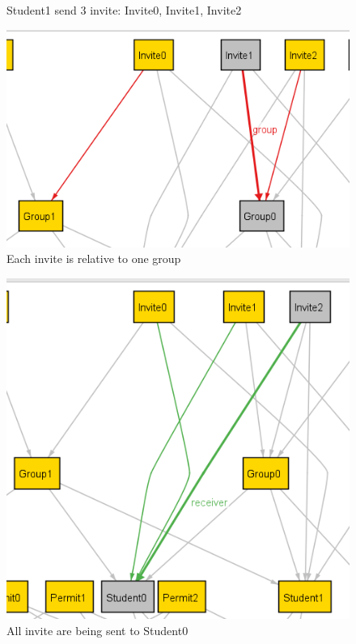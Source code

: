 \documentclass{article}
\begin{document}
{\begin{figure}[H]
    \caption{Student1 send 3 invite: Invite0, Invite1, Invite2}
    \label{fig:sending invite}
\end{figure}
\begin{figure}[H]
    \centering
    \includegraphics{images/ALLOY/group.png}
    \caption{Each invite is relative to one group}
    \label{fig:group invite}
\end{figure}
\begin{figure}[H]
    \centering
    \includegraphics[scale=0.85]{images/ALLOY/receiver.png}
    \caption{All invite are being sent to Student0}
    \label{fig:receiving invite}
\end{figure}
}
\end{document}

